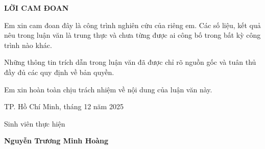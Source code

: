 \begin{declaration}
\begin{center}
\textbf{LỜI CAM ĐOAN}
\end{center}

Em xin cam đoan đây là công trình nghiên cứu của riêng em. Các số liệu, kết quả nêu trong luận văn là trung thực và chưa từng được ai công bố trong bất kỳ công trình nào khác.

Những thông tin trích dẫn trong luận văn đã được chỉ rõ nguồn gốc và tuân thủ đầy đủ các quy định về bản quyền.

Em xin hoàn toàn chịu trách nhiệm về nội dung của luận văn này.

\vspace{2cm}

\begin{flushright}
TP. Hồ Chí Minh, tháng 12 năm 2025

\vspace{1cm}

Sinh viên thực hiện

\vspace{2cm}

\textbf{Nguyễn Trương Minh Hoàng}
\end{flushright}
\end{declaration}
